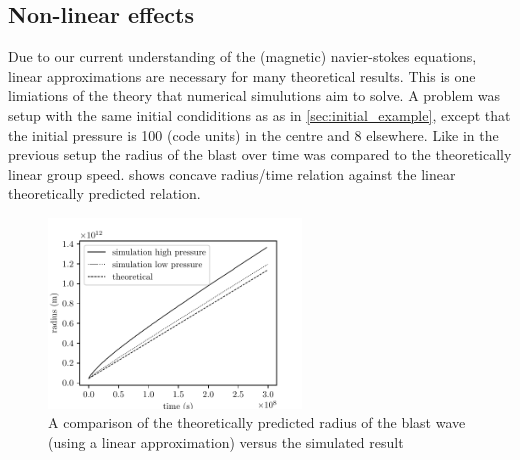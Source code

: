 \documentclass{article}
\begin{document}
\subsection{Non-linear effects} \label{sec:nonlinear_effects}
Due to our current understanding of the (magnetic) navier-stokes equations, linear approximations are necessary for many theoretical results. 
This is one limiations of the theory that numerical simulutions aim to solve.
A problem was setup with the same initial condiditions as as in \cref{sec:initial_example}, except that the initial pressure is 100 (code units) in the centre and 8 elsewhere. 
Like in the previous setup the radius of the blast over time was compared to the theoretically linear group speed.
 shows concave radius/time relation against the linear theoretically predicted relation. 
\begin{figure}[h]
	\centering
	\includegraphics[width=0.6\textwidth]{figures/non_linear_effects.pdf}
	\caption{A comparison of the theoretically predicted radius of the blast wave (using a linear approximation) versus the simulated result}
	\label{fig:non_linear_effects}
\end{figure}
\end{document}
